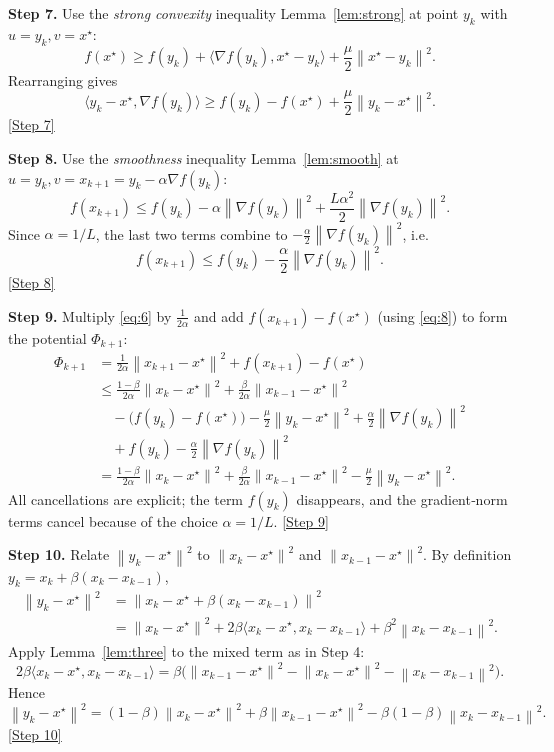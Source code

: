 \documentclass{article}
\newcommand{\norm}[1]{\left\lVert#1\right\rVert}
\newcommand{\ip}[2]{\langle #1,#2\rangle}
\newcommand{\grad}{\nabla}
\begin{document}
\medskip
\noindent\textbf{Step 7.} Use the \emph{strong convexity} inequality Lemma~\ref{lem:strong} at point $y_{k}$ with $u=y_{k}, v=x^{\star}$:
\[
f(x^{\star})\ge f(y_{k})+\ip{\grad f(y_{k})}{x^{\star}-y_{k}}+\frac{\mu}{2}\norm{x^{\star}-y_{k}}^{2}.
\]
Rearranging gives
\[
\ip{y_{k}-x^{\star}}{\grad f(y_{k})}\ge f(y_{k})-f(x^{\star})+\frac{\mu}{2}\norm{y_{k}-x^{\star}}^{2}.
\tag{7}
\]
\noindent\underline{[Step 7]}

\medskip
\noindent\textbf{Step 8.} Use the \emph{smoothness} inequality Lemma~\ref{lem:smooth} at $u=y_{k}, v=x_{k+1}=y_{k}-\alpha\grad f(y_{k})$:
\[
f(x_{k+1})\le f(y_{k})-\alpha\norm{\grad f(y_{k})}^{2}
               +\frac{L\alpha^{2}}{2}\norm{\grad f(y_{k})}^{2}.
\]
Since $\alpha=1/L$, the last two terms combine to $-\frac{\alpha}{2}\norm{\grad f(y_{k})}^{2}$, i.e.
\[
f(x_{k+1})\le f(y_{k})-\frac{\alpha}{2}\norm{\grad f(y_{k})}^{2}.
\tag{8}
\]
\noindent\underline{[Step 8]}

\medskip
\noindent\textbf{Step 9.} Multiply \eqref{eq:6} by $\tfrac{1}{2\alpha}$ and add $f(x_{k+1})-f(x^{\star})$ (using \eqref{eq:8}) to form the potential $\Phi_{k+1}$:
\[
\begin{aligned}
\Phi_{k+1}
&= \frac{1}{2\alpha}\norm{x_{k+1}-x^{\star}}^{2}+f(x_{k+1})-f(x^{\star}) \\
&\le 
\frac{1-\beta}{2\alpha}\norm{x_{k}-x^{\star}}^{2}
+\frac{\beta}{2\alpha}\norm{x_{k-1}-x^{\star}}^{2} \\
&\quad -\bigl(f(y_{k})-f(x^{\star})\bigr)
      -\frac{\mu}{2}\norm{y_{k}-x^{\star}}^{2}
      +\frac{\alpha}{2}\norm{\grad f(y_{k})}^{2}  \\
&\quad +f(y_{k})-\frac{\alpha}{2}\norm{\grad f(y_{k})}^{2} \\
&= \frac{1-\beta}{2\alpha}\norm{x_{k}-x^{\star}}^{2}
   +\frac{\beta}{2\alpha}\norm{x_{k-1}-x^{\star}}^{2}
   -\frac{\mu}{2}\norm{y_{k}-x^{\star}}^{2}.
\end{aligned}
\tag{9}
\]
All cancellations are explicit; the term $f(y_{k})$ disappears, and the gradient‐norm terms cancel because of the choice $\alpha=1/L$.
\noindent\underline{[Step 9]}

\medskip
\noindent\textbf{Step 10.} Relate $\norm{y_{k}-x^{\star}}^{2}$ to $\norm{x_{k}-x^{\star}}^{2}$ and $\norm{x_{k-1}-x^{\star}}^{2}$. By definition $y_{k}=x_{k}+ \beta (x_{k}-x_{k-1})$,
\[
\begin{aligned}
\norm{y_{k}-x^{\star}}^{2}
&= \norm{x_{k}-x^{\star}+\beta (x_{k}-x_{k-1})}^{2} \\
&= \norm{x_{k}-x^{\star}}^{2}
   +2\beta\ip{x_{k}-x^{\star}}{x_{k}-x_{k-1}}
   +\beta^{2}\norm{x_{k}-x_{k-1}}^{2}.
\end{aligned}
\tag{10}
\]
Apply Lemma~\ref{lem:three} to the mixed term as in Step 4:
\[
2\beta\ip{x_{k}-x^{\star}}{x_{k}-x_{k-1}}
 =\beta\bigl(\norm{x_{k-1}-x^{\star}}^{2}
            -\norm{x_{k}-x^{\star}}^{2}
            -\norm{x_{k}-x_{k-1}}^{2}\bigr).
\]
Hence
\[
\norm{y_{k}-x^{\star}}^{2}
= (1-\beta)\norm{x_{k}-x^{\star}}^{2}
  +\beta \norm{x_{k-1}-x^{\star}}^{2}
  -\beta(1-\beta)\norm{x_{k}-x_{k-1}}^{2}.
\tag{11}
\]
\noindent\underline{[Step 10]}
\end{document}
